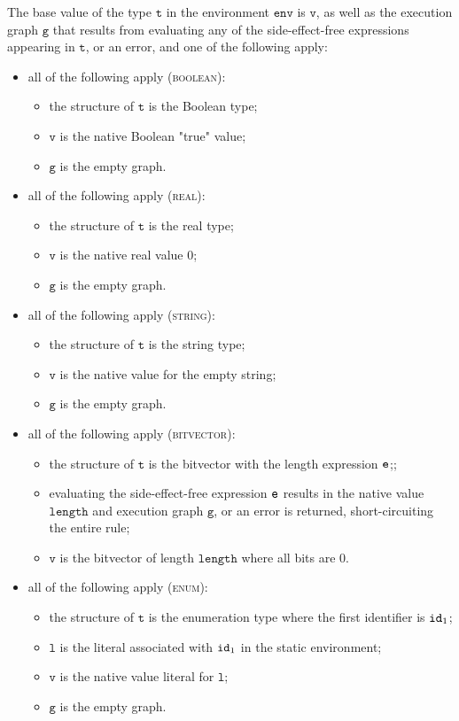 \documentclass{book}
\newcommand\env[0]{\texttt{env}}
\newcommand\vg[0]{\texttt{g}}
\newcommand\vl[0]{\texttt{l}}
\newcommand\vv[0]{\texttt{v}}
\newcommand\vt[0]{\texttt{t}}
\newcommand\length[0]{\texttt{length}}
\begin{document}
The base value of the type $\vt$ in the environment $\env$ is $\vv$,
as well as the execution graph $\vg$ that results
from evaluating any of the side-effect-free expressions appearing in $\vt$,
or an error, and one of the following apply:
\begin{itemize}
  \item all of the following apply (\textsc{boolean}):
  \begin{itemize}
    \item the structure of $\vt$ is the Boolean type;
    \item $\vv$ is the native Boolean "true" value;
    \item $\vg$ is the empty graph.
  \end{itemize}

  \item all of the following apply (\textsc{real}):
  \begin{itemize}
    \item the structure of $\vt$ is the real type;
    \item $\vv$ is the native real value $0$;
    \item $\vg$ is the empty graph.
  \end{itemize}

  \item all of the following apply (\textsc{string}):
  \begin{itemize}
    \item the structure of $\vt$ is the string type;
    \item $\vv$ is the native value for the empty string;
    \item $\vg$ is the empty graph.
  \end{itemize}

  \item all of the following apply (\textsc{bitvector}):
  \begin{itemize}
    \item the structure of $\vt$ is the bitvector with the length expression $\texttt{e}$;;
    \item evaluating the side-effect-free expression $\texttt{e}$ results in the native value $\length$
    and execution graph $\vg$,
    or an error is returned, short-circuiting the entire rule;
    \item $\vv$ is the bitvector of length $\length$ where all bits are $0$.
  \end{itemize}

  \item all of the following apply (\textsc{enum}):
  \begin{itemize}
    \item the structure of $\vt$ is the enumeration type where the first identifier is $\texttt{id}_1$;
    \item $\vl$ is the literal associated with $\texttt{id}_1$ in the static environment;
    \item $\vv$ is the native value literal for $\vl$;
    \item $\vg$ is the empty graph.
  \end{itemize}


\end{itemize}
\end{document}
